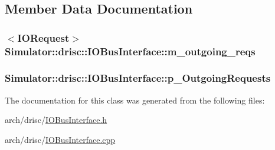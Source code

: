 \subsection{Member Data Documentation}
\hypertarget{class_simulator_1_1drisc_1_1_i_o_bus_interface_af955888334acc96aaf70483976150641}{
\subsubsection[{m\+\_\+outgoing\+\_\+reqs}]{$<${\bf I\+O\+Request}$>$ Simulator\+::drisc\+::\+I\+O\+Bus\+Interface\+::m\+\_\+outgoing\+\_\+reqs}}\label{class_simulator_1_1drisc_1_1_i_o_bus_interface_af955888334acc96aaf70483976150641}
\hypertarget{class_simulator_1_1drisc_1_1_i_o_bus_interface_ac2a130f86754c07a8c863468ab7d1861}{
\subsubsection[{p\+\_\+\+Outgoing\+Requests}]{ Simulator\+::drisc\+::\+I\+O\+Bus\+Interface\+::p\+\_\+\+Outgoing\+Requests}}\label{class_simulator_1_1drisc_1_1_i_o_bus_interface_ac2a130f86754c07a8c863468ab7d1861}


The documentation for this class was generated from the following files\+:\begin{DoxyCompactItemize}
\item 
arch/drisc/\hyperlink{_i_o_bus_interface_8h}{I\+O\+Bus\+Interface.\+h}\item 
arch/drisc/\hyperlink{_i_o_bus_interface_8cpp}{I\+O\+Bus\+Interface.\+cpp}\end{DoxyCompactItemize}
